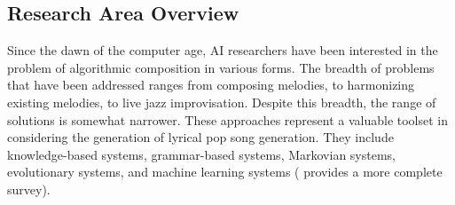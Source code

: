 \documentclass[11pt,phd]{byuprop}
\begin{document}
\subsection{Research Area Overview}
%
%
%
%
%
%
%
%
%
%
%


Since the dawn of the computer age, AI researchers have been interested in the problem of algorithmic composition in various forms. The breadth of problems that have been addressed ranges from composing melodies, to harmonizing existing melodies, to live jazz improvisation. Despite this breadth, the range of solutions is somewhat narrower. These approaches represent a valuable toolset in considering the generation of lyrical pop song generation. They include knowledge-based systems, grammar-based systems, Markovian systems, evolutionary systems, and machine learning systems (\cite{papadopoulos1999ai} provides a more complete survey).
\end{document}
